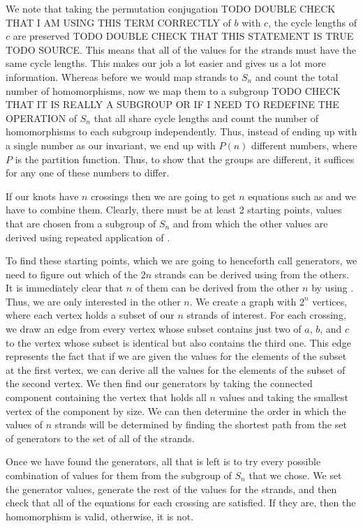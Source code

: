 \begin{paper}

We note that taking the permutation conjugation TODO DOUBLE CHECK THAT I AM
USING THIS TERM CORRECTLY of $b$ with $c$, the cycle lengths of $c$ are
preserved TODO DOUBLE CHECK THAT THIS STATEMENT IS TRUE TODO SOURCE.
This means that all of the values for the strands must have the same cycle
lengths.
This makes our job a lot easier and gives us a lot more information.
Whereas before we would map strands to $S_n$ and count the total number of
homomorphisms, now we map them to a subgroup TODO CHECK THAT IT IS REALLY A
SUBGROUP OR IF I NEED TO REDEFINE THE OPERATION of $S_n$ that all share cycle
lengths and count the number of homomorphisms to each subgroup independently.
Thus, instead of ending up with a single number as our invariant, we end up with
$P(n)$ different numbers, where $P$ is the partition function.
Thus, to show that the groups are different, it suffices for any one of these
numbers to differ.

If our knots have $n$ crossings then we are going to get $n$ equations such as
\eqBoth and we have to combine them.
Clearly, there must be at least 2 starting points, values that are chosen from a
subgroup of $S_n$ and from which the other values are derived using repeated
application of \eqBoth.

To find these starting points, which we are going to henceforth call generators,
we need to figure out which of the $2n$ strands can be derived using \eqBoth
from the others.
It is immediately clear that $n$ of them can be derived from the other $n$ by
using \eqUpper.
Thus, we are only interested in the other $n$.
We create a graph with $2^n$ vertices, where each vertex holds a subset of our
$n$ strands of interest.
For each crossing, we draw an edge from every vertex whose subset contains just
two of $a$, $b$, and $c$ to the vertex whose subset is identical but also
contains the third one.
This edge represents the fact that if we are given the values for the elements
of the subset at the first vertex, we can derive all the values for the elements
of the subset of the second vertex.
We then find our generators by taking the connected component containing the
vertex that holds all $n$ values and taking the smallest vertex of the component
by size.
We can then determine the order in which the values of $n$ strands will be
determined by finding the shortest path from the set of generators to the set of
all of the strands.

Once we have found the generators, all that is left is to try every possible
combination of values for them from the subgroup of $S_n$ that we chose.
We set the generator values, generate the rest of the values for the strands,
and then check that all of the equations for each crossing are satisfied.
If they are, then the homomorphism is valid, otherwise, it is not.




\end{paper}

